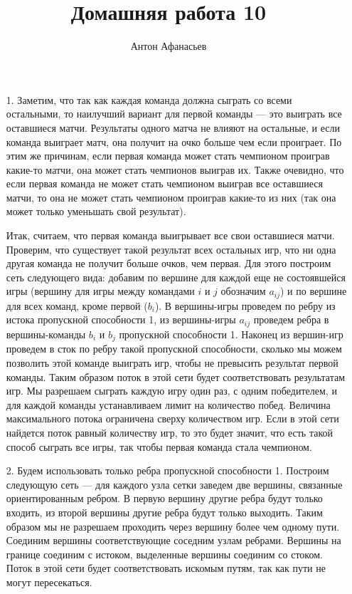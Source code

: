 \documentclass[10pt]{article}
\begin{document}
\title{Домашняя работа 10}
\author{Антон Афанасьев}
\maketitle

\begin{enumerate}
	\item[1.] Заметим, что так как каждая команда должна сыграть со всеми остальными, то наилучший вариант для первой команды --- это выиграть все оставшиеся матчи. Результаты одного матча не влияют на остальные, и если команда выиграет матч, она получит на очко больше чем если проиграет. По этим же причинам, если первая команда может стать чемпионом проиграв какие-то матчи, она может стать чемпионов выиграв их. Также очевидно, что если первая команда не может стать чемпионом выиграв все оставшиеся матчи, то она не может стать чемпионом проиграв какие-то из них (так она может только уменьшать свой результат).
	
	Итак, считаем, что первая команда выигрывает все свои оставшиеся матчи. Проверим, что существует такой результат всех остальных игр, что ни одна другая команда не получит больше очков, чем первая. Для этого построим сеть следующего вида: добавим по вершине для каждой еще не состоявшейся игры (вершину для игры между командами $i$ и $j$ обозначим $a_{ij}$) и по вершине для всех команд, кроме первой ($b_i$). В вершины-игры проведем по ребру из истока пропускной способности 1, из вершины-игры $a_{ij}$ проведем ребра в вершины-команды $b_i$ и $b_j$ пропускной способности 1. Наконец из вершин-игр проведем в сток по ребру такой пропускной способности, сколько мы можем позволить этой команде выиграть игр, чтобы не превысить результат первой команды. Таким образом поток в этой сети будет соответствовать результатам игр. Мы разрешаем сыграть каждую игру один раз, с одним победителем, и для каждой команды устанавливаем лимит на количество побед. Величина максимального потока ограничена сверху количеством игр. Если в этой сети найдется поток равный количеству игр, то это будет значит, что есть такой способ сыграть все игры, так чтобы первая команда стала чемпионом.
	
	\item[2.] Будем использовать только ребра пропускной способности 1. Построим следующую сеть --- для каждого узла сетки заведем две вершины, связанные ориентированным ребром. В первую вершину другие ребра будут только входить, из второй вершины другие ребра будут только выходить. Таким образом мы не разрешаем проходить через вершину более чем одному пути. Соединим вершины соответствующие соседним узлам ребрами. Вершины на границе соединим с истоком, выделенные вершины соединим со стоком. Поток в этой сети будет соответствовать искомым путям, так как пути не могут пересекаться.
	

\end{enumerate}
\end{document}
